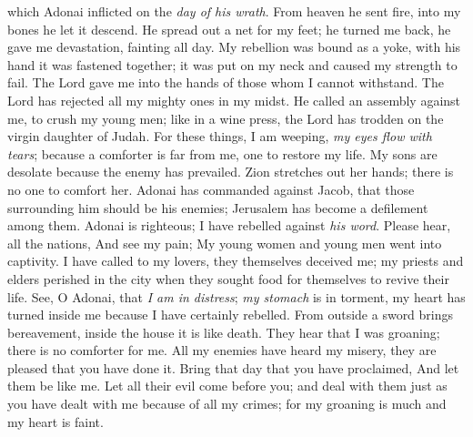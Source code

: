 \begin{biblechapter}
which Adonai inflicted 
on the \textit{day of his wrath}.
\verse From heaven he sent fire, 
into my bones he let it descend. 
He spread out a net for my feet; 
he turned me back, 
he gave me devastation, 
fainting all day.
\verse My rebellion was bound as a yoke, 
with his hand it was fastened together; 
it was put on my neck 
and caused my strength to fail. 
The Lord gave me into the hands 
of those whom I cannot withstand.
\verse The Lord has rejected 
all my mighty ones in my midst. 
He called an assembly against me, 
to crush my young men; 
like in a wine press, 
the Lord has trodden on 
the virgin daughter of Judah.
\verse For these things, I am weeping, 
\textit{my eyes flow with tears}; 
because a comforter is far from me, 
one to restore my life. 
My sons are desolate 
because the enemy has prevailed.
\verse Zion stretches out her hands; 
there is no one to comfort her. 
Adonai has commanded against Jacob, 
that those surrounding him should be his enemies; 
Jerusalem has become 
a defilement among them.
\verse Adonai is righteous; 
I have rebelled against \textit{his word}. 
Please hear, all the nations, 
And see my pain; 
My young women and young men 
went into captivity.
\verse I have called to my lovers, 
they themselves deceived me; 
my priests and elders perished in the city 
when they sought food for themselves 
to revive their life.
\verse See, O Adonai, that \textit{I am in distress}; 
\textit{my stomach} is in torment, 
my heart has turned inside me 
because I have certainly rebelled. 
From outside a sword brings bereavement, 
inside the house it is like death.
\verse They hear that I was groaning; 
there is no comforter for me. 
All my enemies have heard my misery, 
they are pleased that you have done it. 
Bring that day that you have proclaimed, 
And let them be like me.
\verse Let all their evil come before you; 
and deal with them 
just as you have dealt with me 
because of all my crimes; 
for my groaning is much and my heart is faint.
\end{biblechapter}

